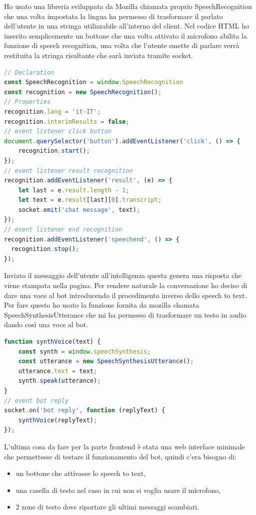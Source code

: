 Ho usato una libreria sviluppata da Mozilla chiamata proprio SpeechRecognition che una volta impostata la lingua ha permesso di trasformare il parlato dell'utente in una stringa utilizzabile all'interno del client.
Nel codice HTML ho inserito semplicemente un bottone che una volta attivato il microfono abilita la funzione di speech recognition, una volta che l'utente smette di parlare verrà restituita la stringa risultante che sarà inviata tramite socket.
\begin{lstlisting}[language=JavaScript]
// Declaration
const SpeechRecognition = window.SpeechRecognition
const recognition = new SpeechRecognition();
// Properties
recognition.lang = 'it-IT';
recognition.interimResults = false;
// event listener click button
document.querySelector('button').addEventListener('click', () => {
    recognition.start();
});
// event listener result recognition
recognition.addEventListener('result', (e) => {
    let last = e.result.length - 1;
    let text = e.result[last][0].transcript;
    socket.emit('chat message', text);
});
// event listener end recognition
recognition.addEventListener('speechend', () => {
  recognition.stop();
});
\end{lstlisting}
Inviato il messaggio dell'utente all'intelligenza questa genera una risposta che viene stampata nella pagina. Per rendere naturale la conversazione ho deciso di dare una voce al bot introducendo il procedimento inverso dello speech to text. Per fare questo ho usato la funzione fornita da mozilla chamata SpeechSynthesisUtterance che mi ha permesso di trasformare un testo in audio dando così una voce al bot.
\begin{lstlisting}[language=JavaScript]
function synthVoice(text) {
    const synth = window.speechSynthesis;
    const utterance = new SpeechSynthesisUtterance();
    utterance.text = text;
    synth.speak(utterance);
}
// event bot reply
socket.on('bot reply', function (replyText) {
    synthVoice(replyText);
});
\end{lstlisting}
L'ultima cosa da fare per la parte frontend è stata una web interface minimale che permettesse di testare il funzionamento del bot, quindi c'era bisogno di:
\begin{itemize}
\item un bottone che attivasse lo speech to text,
\item una casella di testo nel caso in cui non si voglia usare il microfono,
\item 2 zone di testo dove riportare gli ultimi messaggi scambiati.
\end{itemize}
